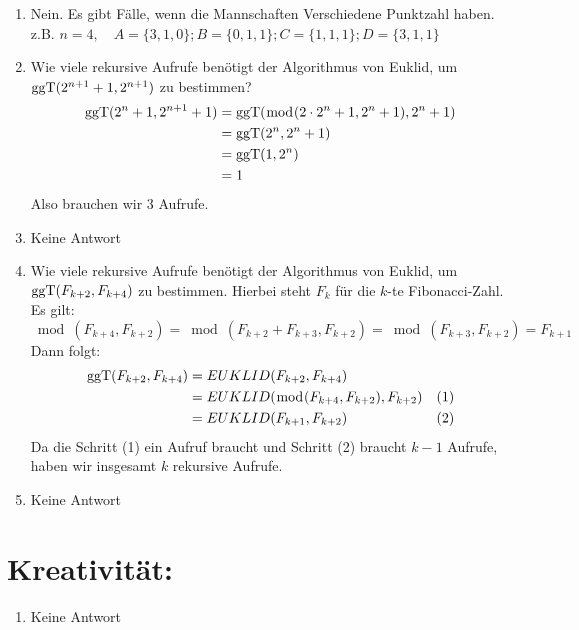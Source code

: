 \begin{enumerate}[label=(\alph*)]
        \item Nein. Es gibt F\"alle, wenn die Mannschaften Verschiedene Punktzahl haben. \\
        z.B. $n=4, \quad A=\{3,1,0\}; B=\{0,1,1\}; C=\{1,1,1\}; D= \{3,1,1 \}$
        
        \item Wie viele rekursive Aufrufe benötigt der Algorithmus von Euklid, um 
        $\operatorname{ggT}(2^{n+1} + 1, 2^{n + 1})$ zu bestimmen?
        \begin{align*}
			\operatorname{ggT}(2^n+1, 2^{n+1} +1) &= \operatorname{ggT}(\bmod(2\cdot 2^n +1, 2^n +1), 2^n+1) \\
			&= \operatorname{ggT}(2^n,2^n+1) \\
			&= \operatorname{ggT}(1,2^n) \\
			&= 1 
		\end{align*}
		Also brauchen wir 3 Aufrufe.
        
        \item Keine Antwort
        
        \item Wie viele rekursive Aufrufe benötigt der Algorithmus von Euklid, um $\operatorname{ggT}(F_{k+2},F_{k+4})$
		zu bestimmen. Hierbei steht $F_k$ für die $k$-te Fibonacci-Zahl.
		Es gilt:
		\[\bmod(F_{k+4},F_{k+2}) = \bmod(F_{k+2} + F_{k+3},F_{k+2}) = \bmod(F_{k+3},F_{k+2}) = F_{k+1}\]
		Dann folgt:
		\begin{align*}
			\operatorname{ggT}(F_{k+2},F_{k+4}) &= EUKLID(F_{k+2},F_{k+4}) \\
			 &= EUKLID(\bmod(F_{k+4},F_{k+2}),F_{k+2}) &(1) \\ 
			 &= EUKLID(F_{k+1},F_{k+2}) &(2)
		\end{align*}
		Da die Schritt (1) ein Aufruf braucht und Schritt (2) braucht $k-1$ Aufrufe, haben wir insgesamt
		$k$ rekursive Aufrufe.

        \item Keine Antwort

    \end{enumerate}
    \section*{Kreativität:}
    \begin{enumerate}[label=(\alph*)]
    	\item Keine Antwort
    \end{enumerate}
